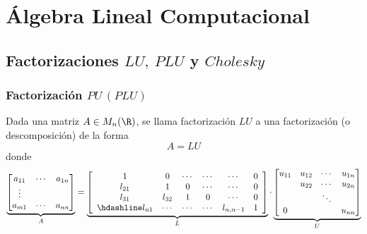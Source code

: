 \section{Álgebra Lineal Computacional}
\subsection{Factorizaciones $LU,\:PLU$ y $Cholesky$}
\subsubsection{Factorización $PU\,(PLU)$}
Dada una matriz $A\in M_n(\R)$, se llama factorización $LU$ a una factorización
(o descomposición) de la forma \[ A=LU \]donde\[ \underbrace{\begin{bmatrix}
		a_{11} & \cdots & a_{1n}\\
		\vdots  & & \\
		a_{m1} & \cdots & a_{nn}
\end{bmatrix}}_A=\underbrace{\left[\begin{array}{cccccc}
		1 & 0 & \cdots & \cdots & \cdots & 0 \\
		l_{21} & 1 & 0 & \cdots & \cdots & 0 \\
		l_{31} & l_{32} & 1 & 0 & \cdots & 0 \\ \hdashline
		l_{n1} & \cdots & \cdots & \cdots & l_{n,n-1} & 1
	\end{array}\right]}_L\cdot\underbrace{\begin{bmatrix}
		u_{11} & u_{12} & \cdots & u_{1n} \\ 
		& u_{22} & \cdots & u_{2n} \\ 
		&  & \ddots &  \\ 
		0 &  &  & u_{nn }
\end{bmatrix}}_U  \]

